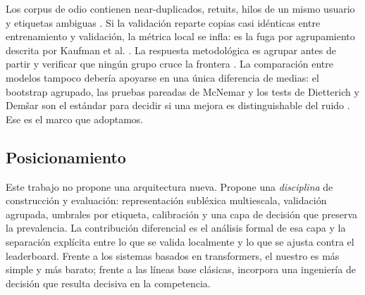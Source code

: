 Los corpus de odio contienen near-duplicados, retuits, hilos de un mismo
usuario y etiquetas ambiguas \cite{founta2018crowdsourcing,davidson2017automated,davidson2019racial,wiegand2019biased}.
Si la validación reparte copias casi idénticas entre entrenamiento y
validación, la métrica local se infla: es la fuga por agrupamiento descrita
por Kaufman et al. \cite{kaufman2012leakage}. La respuesta metodológica es
agrupar antes de partir y verificar que ningún grupo cruce la frontera
\cite{kohavi1995study,kaufman2012leakage}. La comparación entre modelos
tampoco debería apoyarse en una única diferencia de medias: el bootstrap
agrupado, las pruebas pareadas de McNemar y los tests de Dietterich y Demšar
son el estándar para decidir si una mejora es distinguishable del ruido
\cite{efron1979bootstrap,mcnemar1947note,dietterich1998approximate,demsar2006statistical}.
Ese es el marco que adoptamos.

\subsection{Posicionamiento}

Este trabajo no propone una arquitectura nueva. Propone una \emph{disciplina}
de construcción y evaluación: representación subléxica multiescala,
validación agrupada, umbrales por etiqueta, calibración y una capa de
decisión que preserva la prevalencia. La contribución diferencial es el
análisis formal de esa capa y la separación explícita entre lo que se valida
localmente y lo que se ajusta contra el leaderboard. Frente a los sistemas
basados en transformers, el nuestro es más simple y más barato; frente a las
líneas base clásicas, incorpora una ingeniería de decisión que resulta
decisiva en la competencia.
